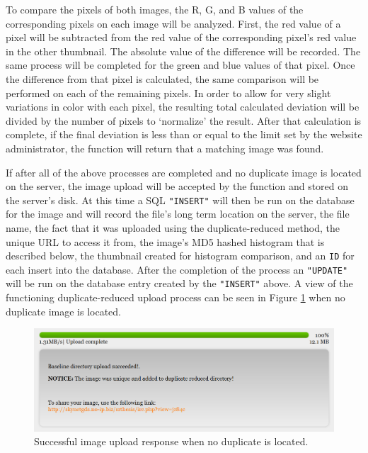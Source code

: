 To compare the pixels of both images, the R, G, and B values of the corresponding pixels on each image will be analyzed. First, the red value of a pixel will be subtracted from the red value of the corresponding pixel's red value in the other thumbnail. The absolute value of the difference will be recorded. The same process will be completed for the green and blue values of that pixel. Once the difference from that pixel is calculated, the same comparison will be performed on each of the remaining pixels. In order to allow for very slight variations in color with each pixel, the resulting total calculated deviation will be divided by the number of pixels to `normalize' the result. After that calculation is complete, if the final deviation is less than or equal to the limit set by the website administrator, the function will return that a matching image was found.

If after all of the above processes are completed and no duplicate image is located on the server, the image upload will be accepted by the function and stored on the server's disk. At this time a SQL {\tt "INSERT"} will then be run on the database for the image and will record the file's long term location on the server, the file name, the fact that it was uploaded using the duplicate-reduced method, the unique URL to access it from, the image's MD5 hashed histogram that is described below, the thumbnail created for histogram comparison, and an {\tt ID} for each insert into the database. After the completion of the process an {\tt "UPDATE"} will be run on the database entry created by the {\tt "INSERT"} above. A view of the functioning duplicate-reduced upload process can be seen in Figure \ref{success_nodupfound} when no duplicate image is located.

\begin{figure}[htbp]
\centering
\includegraphics[width=5.5in]{success_nodupfound}
\caption{Successful image upload response when no duplicate is located.}
\label{success_nodupfound}
\end{figure}

